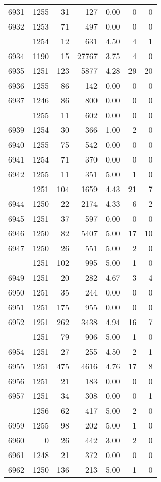 \documentclass[
]{article}
\begin{document}
\begin{table}
\begin{tabular}[t]{lrrrrrr}
6931 & 1255 & 31 & 127 & 0.00 & 0 & 0\\
6932 & 1253 & 71 & 497 & 0.00 & 0 & 0\\
\addlinespace
6933 & 1254 & 12 & 631 & 4.50 & 4 & 1\\
6934 & 1190 & 15 & 27767 & 3.75 & 4 & 0\\
6935 & 1251 & 123 & 5877 & 4.28 & 29 & 20\\
6936 & 1255 & 86 & 142 & 0.00 & 0 & 0\\
6937 & 1246 & 86 & 800 & 0.00 & 0 & 0\\
\addlinespace
6938 & 1255 & 11 & 602 & 0.00 & 0 & 0\\
6939 & 1254 & 30 & 366 & 1.00 & 2 & 0\\
6940 & 1255 & 75 & 542 & 0.00 & 0 & 0\\
6941 & 1254 & 71 & 370 & 0.00 & 0 & 0\\
6942 & 1255 & 11 & 351 & 5.00 & 1 & 0\\
\addlinespace
6943 & 1251 & 104 & 1659 & 4.43 & 21 & 7\\
6944 & 1250 & 22 & 2174 & 4.33 & 6 & 2\\
6945 & 1251 & 37 & 597 & 0.00 & 0 & 0\\
6946 & 1250 & 82 & 5407 & 5.00 & 17 & 10\\
6947 & 1250 & 26 & 551 & 5.00 & 2 & 0\\
\addlinespace
6948 & 1251 & 102 & 995 & 5.00 & 1 & 0\\
6949 & 1251 & 20 & 282 & 4.67 & 3 & 4\\
6950 & 1251 & 35 & 244 & 0.00 & 0 & 0\\
6951 & 1251 & 175 & 955 & 0.00 & 0 & 0\\
6952 & 1251 & 262 & 3438 & 4.94 & 16 & 7\\
\addlinespace
6953 & 1251 & 79 & 906 & 5.00 & 1 & 0\\
6954 & 1251 & 27 & 255 & 4.50 & 2 & 1\\
6955 & 1251 & 475 & 4616 & 4.76 & 17 & 8\\
6956 & 1251 & 21 & 183 & 0.00 & 0 & 0\\
6957 & 1251 & 34 & 308 & 0.00 & 0 & 1\\
\addlinespace
6958 & 1256 & 62 & 417 & 5.00 & 2 & 0\\
6959 & 1255 & 98 & 202 & 5.00 & 1 & 0\\
6960 & 0 & 26 & 442 & 3.00 & 2 & 0\\
6961 & 1248 & 21 & 372 & 0.00 & 0 & 0\\
6962 & 1250 & 136 & 213 & 5.00 & 1 & 0\\

\end{tabular}
\end{table}
\end{document}

